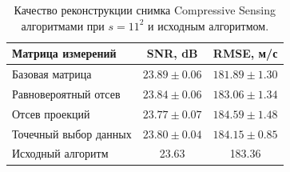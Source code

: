 \documentclass[14pt]{matmex-diploma-custom}
\begin{document}
\begin{table}
\centering
\begin{tabular}{| l | c | c | }
    \hline
    Матрица измерений & SNR, dB & RMSE, м/с \\
    \hline
    Базовая матрица & $\mathbf{23.89 \pm 0.06}$ & $\mathbf{181.89 \pm 1.30}$ \\
    Равновероятный отсев & $23.84 \pm 0.06$ & $183.06 \pm 1.34$ \\
    Отсев проекций & $23.77 \pm 0.07$ & $184.59 \pm 1.48$ \\
    Точечный выбор данных & $23.80 \pm 0.04$ & $184.15 \pm 0.85$ \\
    \hline
    Исходный алгоритм & 23.63 & 183.36 \\
    \hline
\end{tabular}
\caption{\small Качество реконструкции снимка Compressive Sensing алгоритмами при $s = 11^2$  и исходным алгоритмом.}
\label{table:fin_results}
\end{table}
\end{document}
